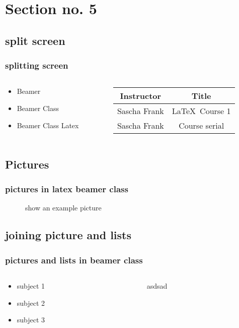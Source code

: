 \documentclass{beamer}
\begin{document}
\section{Section no. 5}
\subsection{split screen}

\begin{frame}\frametitle{splitting screen}
\begin{columns}
\begin{column}{5cm}
\begin{itemize}
\item Beamer 
\item Beamer Class 
\item Beamer Class Latex 
\end{itemize}
\end{column}
\begin{column}{5cm}
\begin{tabular}{|c|c|}
\hline
\textbf{Instructor} & \textbf{Title} \\
\hline
Sascha Frank &  \LaTeX \ Course 1 \\
\hline
Sascha Frank &  Course serial  \\
\hline
\end{tabular}
\end{column}
\end{columns}
\end{frame}

\subsection{Pictures} 
\begin{frame}\frametitle{pictures in latex beamer class}
\begin{figure}
\caption{show an example picture}
\end{figure}
\end{frame}

\subsection{joining picture and lists} 

\begin{frame}
\frametitle{pictures and lists in beamer class}
\begin{columns}
\begin{column}{5cm}
\begin{itemize}
\item<1-> subject 1
\item<3-> subject 2
\item<5-> subject 3
\end{itemize}
\vspace{3cm} 
\end{column}
\begin{column}{5cm}
asdsad
\end{column}
\end{columns}
\end{frame}
\end{document}
